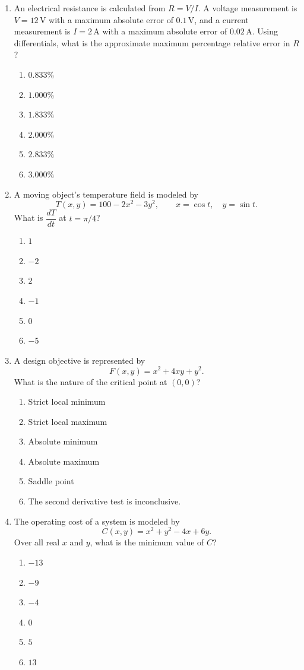 \documentclass[a4paper,12pt]{article}
\theoremstyle{mystyle}
\numberwithin{equation}{section}
\numberwithin{theorem}{section}
\numberwithin{proposition}{section}
\numberwithin{example}{section}
\numberwithin{remark}{section}
\numberwithin{lemma}{section}
\numberwithin{corollary}{section}
\numberwithin{definition}{section}
\begin{document}
\begin{enumerate}
\item An electrical resistance is calculated from $R=V/I$. A voltage
measurement is $V=12\,\mathrm{V}$ with a maximum absolute error of
$0.1\,\mathrm{V}$, and a current measurement is $I=2\,\mathrm{A}$
with a maximum absolute error of $0.02\,\mathrm{A}$.
Using differentials, what is the approximate maximum percentage
relative error in $R$?
\begin{enumerate}
    \item $0.833\%$
    \item $1.000\%$
    \item $1.833\%$
    \item $2.000\%$
    \item $2.833\%$
    \item $3.000\%$
\end{enumerate}

\item A moving object's temperature field is modeled by
\[
    T(x,y)=100-2x^2-3y^2,
    \qquad x=\cos t,\quad y=\sin t.
\]
What is $\dfrac{dT}{dt}$ at $t=\pi/4$?
\begin{enumerate}
    \item $1$
    \item $-2$
    \item $2$
    \item $-1$
    \item $0$
    \item $-5$
\end{enumerate}

\item A design objective is represented by
\[
    F(x,y)=x^2+4xy+y^2.
\]
What is the nature of the critical point at $(0,0)$?
\begin{enumerate}
    \item Strict local minimum
    \item Strict local maximum
    \item Absolute minimum
    \item Absolute maximum
    \item Saddle point
    \item The second derivative test is inconclusive.
\end{enumerate}

\item The operating cost of a system is modeled by
\[
    C(x,y)=x^2+y^2-4x+6y.
\]
Over all real $x$ and $y$, what is the minimum value of $C$?
\begin{enumerate}
    \item $-13$
    \item $-9$
    \item $-4$
    \item $0$
    \item $5$
    \item $13$
\end{enumerate}


\end{enumerate}
\end{document}
